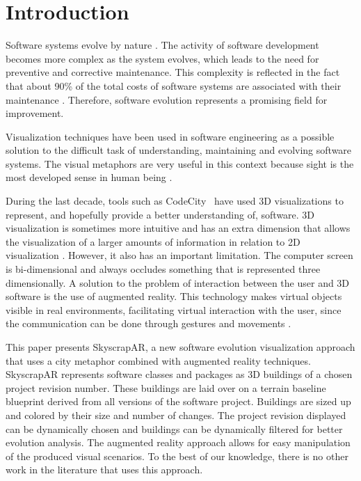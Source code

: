 \section{Introduction} \label{sec:intro}
Software systems evolve by nature \cite{lehman:1980}. The activity of software development becomes more complex as the system evolves, which leads to the need for preventive and corrective maintenance. This complexity is reflected in the fact that about 90\% of the total costs of software systems are associated with their maintenance \cite{erlikh:2000}. Therefore, software evolution represents a promising field for improvement.

Visualization techniques have been used in software engineering as a possible solution to the difficult task of understanding, maintaining and evolving software systems. The visual metaphors are very useful in this context because sight is the most developed sense in human being \cite{diehl:2007}.

During the last decade, tools such as CodeCity~\cite{wettel:2008} have used 3D visualizations to represent, and hopefully provide a better understanding of, software. 3D visualization is sometimes more intuitive and has an extra dimension that allows the visualization of a larger amounts of information in relation to 2D visualization \cite{teyseyre:2009}. However, it also has an important limitation. The computer screen is bi-dimensional and always occludes something that is represented three dimensionally. A solution to the problem of interaction between the user and 3D software is the use of augmented reality. This technology makes virtual objects visible in real environments, facilitating virtual interaction with the user, since the communication can be done through gestures and movements \cite{azuma:1997}.

This paper presents SkyscrapAR, a new software evolution visualization approach that uses a city metaphor combined with augmented reality techniques. SkyscrapAR represents software classes and packages as 3D buildings of a chosen project revision number. These buildings are laid over on a terrain baseline blueprint derived from all versions of the software project. Buildings are sized up and colored by their size and number of changes. The project revision displayed can be dynamically chosen and buildings can be dynamically filtered for better evolution analysis. The augmented reality approach allows for easy manipulation of the produced visual scenarios. To the best of our knowledge, there is no other work in the literature that uses this approach.

